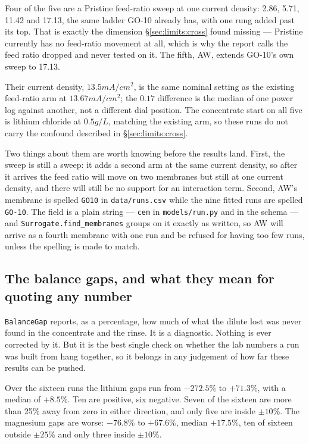 Four of the five are a Pristine feed-ratio sweep at one current density: 2.86, 5.71, 11.42
and 17.13, the same ladder GO-10 already has, with one rung added past its top. That is
exactly the dimension \S\ref{sec:limits:cross} found missing --- Pristine currently has no
feed-ratio movement at all, which is why the report calls the feed ratio dropped and
never tested on it. The fifth, AW, extends GO-10's own sweep to 17.13.

Their current density, $13.5\unit{mA/cm^2}$, is the same nominal setting as the existing
feed-ratio arm at $13.67\unit{mA/cm^2}$; the $0.17$ difference is the median of one power
log against another, not a different dial position. The concentrate start on all five is
lithium chloride at $0.5\unit{g/L}$, matching the existing arm, so these runs do not carry
the confound described in \S\ref{sec:limits:cross}.

Two things about them are worth knowing before the results land. First, the sweep is still
a sweep: it adds a second arm at the same current density, so after it arrives the feed
ratio will move on two membranes but still at one current density, and there will still be
no support for an interaction term. Second, AW's membrane is spelled \texttt{GO10} in
\texttt{data/runs.csv} while the nine fitted runs are spelled \texttt{GO-10}. The field is
a plain string --- \texttt{cem} in \texttt{models/run.py} and in the schema --- and
\texttt{Surrogate.find\_membranes} groups on it exactly as written, so AW will arrive as a
fourth membrane with one run and be refused for having too few runs, unless the spelling
is made to match.

\subsection{The balance gaps, and what they mean for quoting any number}
\label{sec:limits:gaps}

\texttt{BalanceGap} reports, as a percentage, how much of what the dilute lost was never
found in the concentrate and the rinse. It is a diagnostic. Nothing is ever corrected by
it. But it is the best single check on whether the lab numbers a run was built from hang
together, so it belongs in any judgement of how far these results can be pushed.

Over the sixteen runs the lithium gaps run from $-272.5\%$ to $+71.3\%$, with a median of
$+8.5\%$. Ten are positive, six negative. Seven of the sixteen are more than 25\% away
from zero in either direction, and only five are inside $\pm 10\%$. The magnesium gaps are
worse: $-76.8\%$ to $+67.6\%$, median $+17.5\%$, ten of sixteen outside $\pm 25\%$ and
only three inside $\pm 10\%$.

